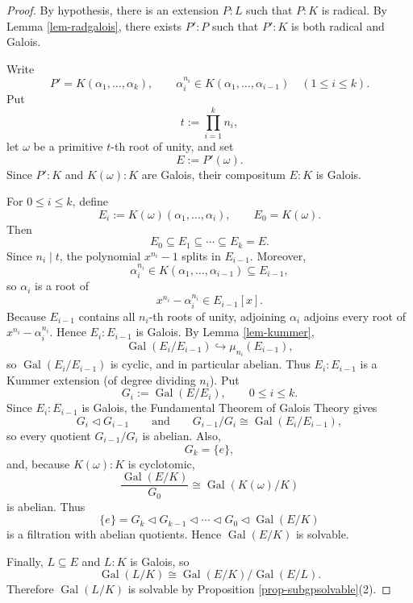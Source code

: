 \begin{proof}
    By hypothesis, there is an extension $P:L$ such that $P:K$ is radical. By Lemma \ref{lem-radgalois}, there exists $P':P$ such that $P':K$ is both radical and Galois.

    Write
    \[
    P'=K(\alpha_1,\dots,\alpha_k),
    \qquad
    \alpha_i^{n_i}\in K(\alpha_1,\dots,\alpha_{i-1})
    \quad (1\leq i\leq k).
    \]
    Put
    \[
    t:=\prod_{i=1}^k n_i,
    \]
    let $\omega$ be a primitive $t$-th root of unity, and set
    \[
    E:=P'(\omega).
    \]
    Since $P':K$ and $K(\omega):K$ are Galois, their compositum $E:K$ is Galois.

    For $0\leq i\leq k$, define
    \[
    E_i:=K(\omega)(\alpha_1,\dots,\alpha_i),
    \qquad
    E_0=K(\omega).
    \]
    Then
    \[
    E_0\subseteq E_1\subseteq\cdots\subseteq E_k=E.
    \]
    Since $n_i\mid t$, the polynomial $x^{n_i}-1$ splits in $E_{i-1}$. Moreover,
    \[
    \alpha_i^{n_i}\in K(\alpha_1,\dots,\alpha_{i-1})
    \subseteq E_{i-1},
    \]
    so $\alpha_i$ is a root of
    \[
    x^{n_i}-\alpha_i^{n_i}\in E_{i-1}[x].
    \]
    Because $E_{i-1}$ contains all $n_i$-th roots of unity, adjoining $\alpha_i$
    adjoins every root of $x^{n_i}-\alpha_i^{n_i}$. Hence $E_i:E_{i-1}$
    is Galois. By Lemma \ref{lem-kummer},
    \[
    \operatorname{Gal}(E_i/E_{i-1})\hookrightarrow \mu_{n_i}(E_{i-1}),
    \]
    so $\operatorname{Gal}(E_i/E_{i-1})$ is cyclic, and in particular abelian.
    Thus $E_i:E_{i-1}$ is a Kummer extension (of degree dividing $n_i$).
    Put
    \[
    G_i:=\operatorname{Gal}(E/E_i),
    \qquad 0\leq i\leq k.
    \]
    Since $E_i:E_{i-1}$ is Galois, the Fundamental Theorem of Galois Theory gives
    \[
    G_i\lhd G_{i-1}
    \qquad\text{and}\qquad
    G_{i-1}/G_i\cong\operatorname{Gal}(E_i/E_{i-1}),
    \]
    so every quotient $G_{i-1}/G_i$ is abelian. Also,
    \[
    G_k=\{e\},
    \]
    and, because $K(\omega):K$ is cyclotomic,
    \[
    \frac{\operatorname{Gal}(E/K)}{G_0}
    \cong \operatorname{Gal}(K(\omega)/K)
    \]
    is abelian. Thus
    \[
    \{e\}=G_k\lhd G_{k-1}\lhd\cdots\lhd G_0
    \lhd \operatorname{Gal}(E/K)
    \]
    is a filtration with abelian quotients. Hence $\operatorname{Gal}(E/K)$ is solvable.

    Finally, $L\subseteq E$ and $L:K$ is Galois, so
    \[
    \operatorname{Gal}(L/K)
    \cong
    \operatorname{Gal}(E/K)/\operatorname{Gal}(E/L).
    \]
    Therefore $\operatorname{Gal}(L/K)$ is solvable by Proposition \ref{prop-subgpsolvable}(2).
\end{proof}

